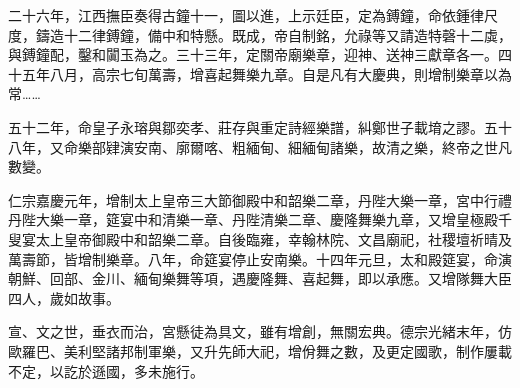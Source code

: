 \begin{pinyinscope}
二十六年，江西撫臣奏得古鐘十一，圖以進，上示廷臣，定為鎛鐘，命依鍾律尺度，鑄造十二律鎛鐘，備中和特懸。既成，帝自制銘，允祿等又請造特磬十二虡，與鎛鐘配，鑿和闐玉為之。三十三年，定關帝廟樂章，迎神、送神三獻章各一。四十五年八月，高宗七旬萬壽，增喜起舞樂九章。自是凡有大慶典，則增制樂章以為常……

五十二年，命皇子永瑢與鄒奕孝、莊存與重定詩經樂譜，糾鄭世子載堉之謬。五十八年，又命樂部肄演安南、廓爾喀、粗緬甸、細緬甸諸樂，故清之樂，終帝之世凡數變。

仁宗嘉慶元年，增制太上皇帝三大節御殿中和韶樂二章，丹陛大樂一章，宮中行禮丹陛大樂一章，筵宴中和清樂一章、丹陛清樂二章、慶隆舞樂九章，又增皇極殿千叟宴太上皇帝御殿中和韶樂二章。自後臨雍，幸翰林院、文昌廟祀，社稷壇祈晴及萬壽節，皆增制樂章。八年，命筵宴停止安南樂。十四年元旦，太和殿筵宴，命演朝鮮、回部、金川、緬甸樂舞等項，遇慶隆舞、喜起舞，即以承應。又增隊舞大臣四人，歲如故事。

宣、文之世，垂衣而治，宮懸徒為具文，雖有增創，無關宏典。德宗光緒末年，仿歐羅巴、美利堅諸邦制軍樂，又升先師大祀，增佾舞之數，及更定國歌，制作屢載不定，以訖於遜國，多未施行。


\end{pinyinscope}